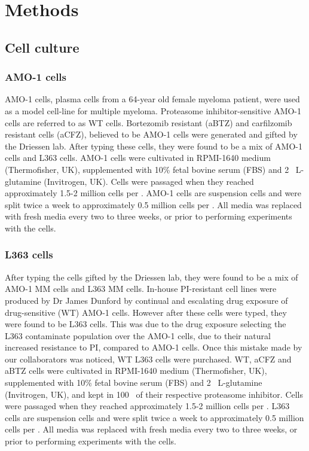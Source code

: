 \chapter{\label{ch:3-methods}Methods}


\section{Cell culture}
\subsection{AMO-1 cells}
AMO-1 cells, plasma cells from a 64-year old female myeloma patient, were used as a model cell-line for multiple myeloma.
Proteasome inhibitor-sensitive AMO-1 cells are referred to as WT cells.
Bortezomib resistant (aBTZ) and carfilzomib resistant cells (aCFZ), believed to be AMO-1 cells were generated and gifted by the Driessen lab\cite{soriano2016proteasome}.
After typing these cells, they were found to be a mix of AMO-1 cells and L363 cells.
AMO-1 cells were cultivated in RPMI-1640 medium (Thermofisher, UK), supplemented with 10\% fetal bovine serum (FBS) and 2\si{\milli\Molar} L-glutamine (Invitrogen, UK).
Cells were passaged when they reached approximately 1.5-2 million cells per \ml{}.
AMO-1 cells are suspension cells and were split twice a week to approximately 0.5 million cells per \ml{}.
All media was replaced with fresh media every two to three weeks, or prior to performing experiments with the cells.

\subsection{L363 cells}
After typing the cells gifted by the Driessen lab, they were found to be a mix of AMO-1 MM cells and L363 MM cells.
In-house PI-resistant cell lines were produced by Dr James Dunford by continual and escalating drug exposure of drug-sensitive (WT) AMO-1 cells.
However after these cells were typed, they were found to be L363 cells.
This was due to the drug exposure selecting the L363 contaminate population over the AMO-1 cells, due to their natural increased resistance to PI, compared to AMO-1 cells.
Once this mistake made by our collaborators was noticed, WT L363 cells were purchased.
WT, aCFZ and aBTZ cells were cultivated in RPMI-1640 medium (Thermofisher, UK), supplemented with 10\% fetal bovine serum (FBS) and 2\si{\milli\Molar} L-glutamine (Invitrogen, UK), and kept in 100\si{\nano\Molar} of their respective proteasome inhibitor.
Cells were passaged when they reached approximately 1.5-2 million cells per \ml{}.
L363 cells are suspension cells and were split twice a week to approximately 0.5 million cells per \ml{}.
All media was replaced with fresh media every two to three weeks, or prior to performing experiments with the cells.

